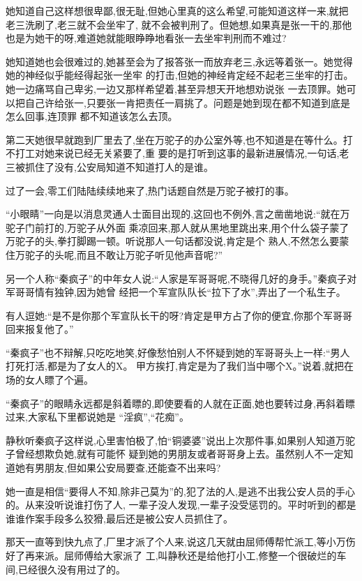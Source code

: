 ﻿\documentclass[12pt]{article}
\begin{document}
她知道自己这样想很卑鄙,很无耻,但她心里真的这么希望,可能知道这样一来,就把老三洗刷了,老三就不会坐牢了,
就不会被判刑了。但她想,如果真是张一干的,那他也是为她干的呀,难道她就能眼睁睁地看张一去坐牢判刑而不难过?

她知道她也会很难过的,她甚至会为了报答张一而放弃老三,永远等着张一。她觉得她的神经似乎能经得起张一坐牢
的打击,但她的神经肯定经不起老三坐牢的打击。她一边痛骂自己卑劣,一边又那样希望着,甚至异想天开地想劝说张
一去顶罪。她可以把自己许给张一,只要张一肯把责任一肩挑了。问题是她到现在都不知道到底是怎么回事,连顶罪
都不知道该怎么去顶。

第二天她很早就跑到厂里去了,坐在万驼子的办公室外等,也不知道是在等什么。打不打工对她来说已经无关紧要了,重
要的是打听到这事的最新进展情况,一句话,老三被抓住了没有,公安局知道不知道打人的是谁。

过了一会,零工们陆陆续续地来了,热门话题自然是万驼子被打的事。

``小眼睛''一向是以消息灵通人士面目出现的,这回也不例外,言之凿凿地说:``就在万驼子门前打的,万驼子从外面
乘凉回来,那人就从黑地里跳出来,用个什么袋子蒙了万驼子的头,拳打脚踢一顿。听说那人一句话都没说,肯定是个
熟人,不然怎么要蒙住万驼子的头呢,而且不敢让万驼子听见他声音呢?''

另一个人称``秦疯子''的中年女人说:``人家是军哥哥呢,不晓得几好的身手。''秦疯子对军哥哥情有独钟,因为她曾
经把一个军宣队队长``拉下了水'',弄出了一个私生子。

有人逗她:``是不是你那个军宣队长干的呀?肯定是甲方占了你的便宜,你那个军哥哥回来报复他了。''

``秦疯子''也不辩解,只吃吃地笑,好像愁怕别人不怀疑到她的军哥哥头上一样:``男人打死打活,都是为了女人的X。
甲方挨打,肯定是为了我们当中哪个X。''说着,就把在场的女人瞟了个遍。

``秦疯子''的眼睛永远都是斜着瞟的,即使要看的人就在正面,她也要转过身,再斜着瞟过来,大家私下里都说她是
``淫疯'',``花痴''。

静秋听秦疯子这样说,心里害怕极了,怕``铜婆婆''说出上次那件事,如果别人知道万驼子曾经想欺负她,就有可能怀
疑到她的男朋友或者哥哥身上去。虽然别人不一定知道她有男朋友,但如果公安局要查,还能查不出来吗?

她一直是相信``要得人不知,除非己莫为''的,犯了法的人,是逃不出我公安人员的手心的。从来没听说谁打伤了人,
一辈子没人发现,一辈子没受惩罚的。平时听到的都是谁谁作案手段多么狡猾,最后还是被公安人员抓住了。

那天一直等到快九点了,厂里才派了个人来,说这几天就由屈师傅帮忙派工,等小万伤好了再来派。屈师傅给大家派了
工,叫静秋还是给他打小工,修整一个很破烂的车间,已经很久没有用过了的。
\end{document}
